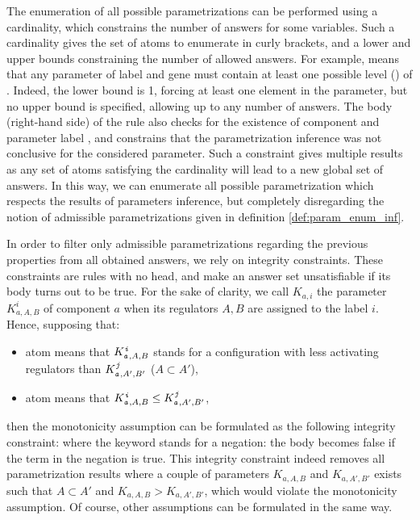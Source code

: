 The enumeration of all possible parametrizations can be performed using a cardinality, which constrains the number of answers for some variables. Such a cardinality gives the set of atoms to enumerate in curly brackets, and a lower and upper bounds constraining the number of allowed answers. For example,
means that any parameter of label  and gene  must contain at least one possible level () of . Indeed, the lower bound is 1, forcing at least one element in the parameter, but no upper bound is specified, allowing up to any number of answers. The body (right-hand side) of the rule also checks for the existence of component  and parameter label , and constrains that the parametrization inference was not conclusive for the considered parameter.
Such a constraint gives multiple results as any set of atoms satisfying the cardinality will lead to a new global set of answers.
In this way, we can enumerate all possible parametrization which respects the results of parameters inference, but completely disregarding the notion of admissible parametrizations given in definition \ref{def:param_enum_inf}.

In order to filter only admissible parametrizations regarding the previous properties from all obtained answers, we rely on integrity constraints. These constraints are rules with no head, and make an answer set unsatisfiable if its body turns out to be true. For the sake of clarity, we call $K_{a,i}$ the parameter $K^i_{a,A,B}$ of component $a$ when its regulators $A,B$ are assigned to the label $i$. Hence, supposing that:
\begin{itemize}
  \item {} atom means that $K^{\texttt{\textit{i}}}_{\texttt{\textit{a}},A,B}$ stands for a configuration with less activating regulators than $K^{\texttt{\textit{j}}}_{\texttt{\textit{a}},A',B'}$ (\ie $A \subset A'$),
  \item {} atom means that $K^{\texttt{\textit{i}}}_{\texttt{\textit{a}},A,B} \leq K^{\texttt{\textit{j}}}_{\texttt{\textit{a}},A',B'}$,
\end{itemize}
then the monotonicity assumption can be formulated as the following integrity constraint:
where the  keyword stands for a negation: the body becomes false if the term in the negation is true. This integrity constraint indeed removes all parametrization results where a couple of parameters $K_{a,A,B}$ and $K_{a,A',B'}$ exists such that $A \subset A'$ and $K_{a,A,B} > K_{a,A',B'}$, which would violate the monotonicity assumption. Of course, other assumptions can be formulated in the same way.

